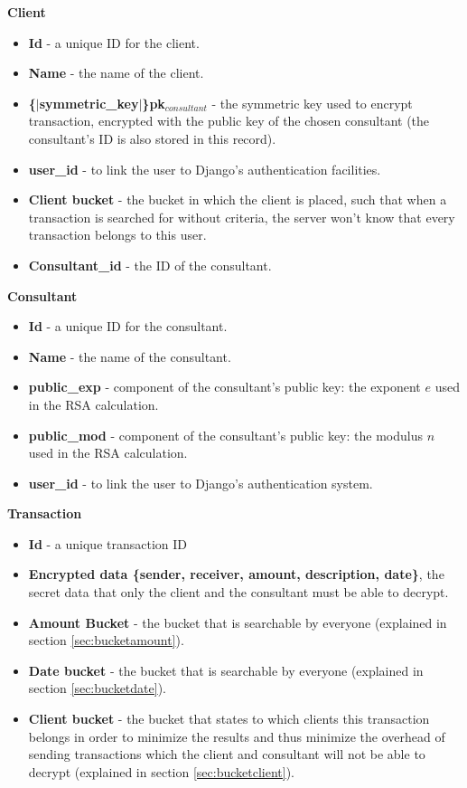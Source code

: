\documentclass[a4paper]{article}
\begin{document}
    \textbf{Client}
    \begin{itemize}
        \item \textbf{Id} - a unique ID for the client.
        \item \textbf{Name} - the name of the client.
        \item \textbf{\{$|$symmetric\_key$|$\}pk$_{consultant}$} - the symmetric key used to encrypt transaction, encrypted with the public key of the chosen consultant (the consultant's ID is also stored in this record). 
        \item \textbf{user\_id} - to link the user to Django's authentication facilities.
        \item \textbf{Client bucket} - the bucket in which the client is placed, such that when a transaction is searched for without criteria, the server won't know that every transaction belongs to this user.
        \item \textbf{Consultant\_id} - the ID of the consultant.
    \end{itemize}
    
    \textbf{Consultant}
    \begin{itemize}
        \item \textbf{Id} - a unique ID for the consultant.
        \item \textbf{Name} - the name of the consultant.
        \item \textbf{public\_exp} - component of the consultant's public key: the exponent $e$ used in the RSA calculation.
        \item \textbf{public\_mod} - component of the consultant's public key: the modulus $n$ used in the RSA calculation.
        \item \textbf{user\_id} - to link the user to Django's authentication system.
    \end{itemize}
    
    \textbf{Transaction}
    \begin{itemize}
        \item \textbf{Id} - a unique transaction ID
        \item \textbf{Encrypted data \{sender, receiver, amount, description, date\}}, the secret data that only the client and the consultant must be able to decrypt.
        \item \textbf{Amount Bucket} - the bucket that is searchable by everyone (explained in section \ref{sec:bucketamount}).
        \item \textbf{Date bucket} - the bucket that is searchable by everyone (explained in section \ref{sec:bucketdate}).
        \item \textbf{Client bucket} - the bucket that states to which clients this transaction belongs in order to minimize the results and thus minimize the overhead of sending transactions which the client and consultant will not be able to decrypt (explained in section \ref{sec:bucketclient}). 
    \end{itemize}
    
\end{document}
